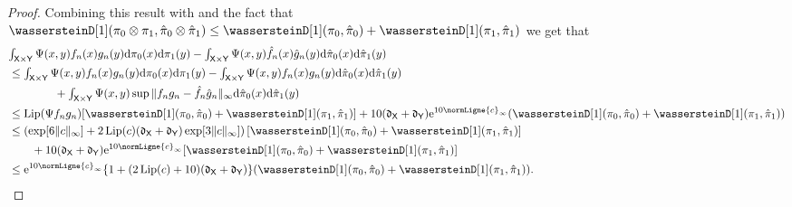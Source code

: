 \documentclass[11pt,a4paper]{article}
\begin{document}
\begin{proof}
Combining this result with  and the fact that $\wassersteinD[1](\pi_0 \otimes \pi_1, \hat{\pi}_0 \otimes \hat{\pi}_1)\leq
\wassersteinD[1](\pi_0, \hat{\pi}_0) + \wassersteinD[1](\pi_1, \hat{\pi}_1)$ we get that
\begin{align}
\label{eq:bound_wass_uno}
&\textstyle{\int_{\msx \times \msy} \Psi(x,y) f_n(x) g_n(y) \rmd \pi_0(x) \rmd \pi_1(y) - \int_{\msx \times \msy}\Psi(x,y) \hat f_n(x) \hat g_n(y) \rmd \hat{\pi}_0(x) \rmd \hat{\pi}_1(y) }  \\
&\leq \textstyle{\int_{\msx \times \msy} \Psi(x,y) f_n(x) g_n(y) \rmd \pi_0(x) \rmd \pi_1(y) - \int_{\msx \times \msy}\Psi(x,y) f_n(x) g_n(y) \rmd \hat{\pi}_0(x) \rmd \hat{\pi}_1(y) }  \\
&\qquad\qquad  + \textstyle{\int_{\msx \times \msy} \Psi(x,y) \sup\|f_n g_n- \hat f_n \hat g_n\|_\infty \rmd \hat\pi_0(x) \rmd \hat\pi_1(y) }\\
&\leq \Lip(\Psi f_n g_n) [\wassersteinD[1](\pi_0, \hat{\pi}_0) + \wassersteinD[1](\pi_1, \hat{\pi}_1) ]
+ 10(\diam_\msx +\diam_\msy) \rme^{10 \normLigne{c}_\infty} (\wassersteinD[1](\pi_0, \hat{\pi}_0) + \wassersteinD[1](\pi_1, \hat{\pi}_1) )  \\
&\leq \left(\exp[6\|c\|_\infty] + 2\Lip(c)(\diam_\msx+\diam_\msy)\exp[3\|c\|_\infty]\right) [\wassersteinD[1](\pi_0, \hat{\pi}_0) + \wassersteinD[1](\pi_1, \hat{\pi}_1) ]\\
&\qquad + 10(\diam_\msx +\diam_\msy) \rme^{10 \normLigne{c}_\infty} [\wassersteinD[1](\pi_0, \hat{\pi}_0) + \wassersteinD[1](\pi_1, \hat{\pi}_1) ]  \\
& \leq \rme^{10 \normLigne{c}_\infty} \{1 + (2\Lip(c)+10) (\diam_\msx + \diam_\msy) \} (\wassersteinD[1](\pi_0, \hat{\pi}_0) + \wassersteinD[1](\pi_1, \hat{\pi}_1)). 
\end{align}

\end{proof}
\end{document}
